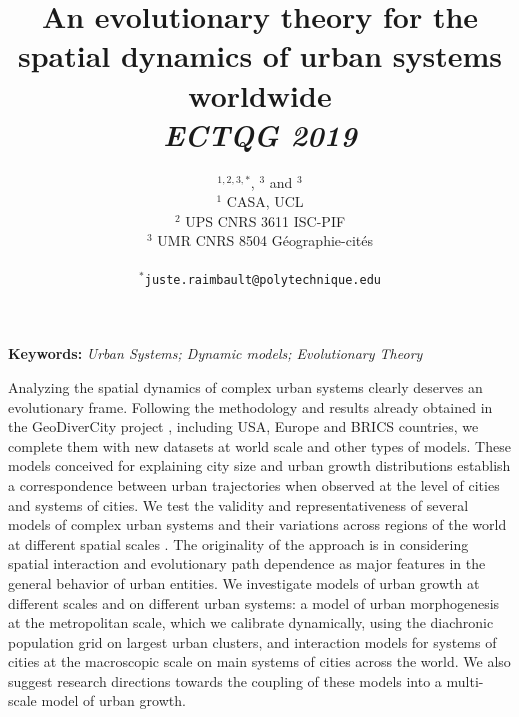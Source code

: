 \documentclass[11pt]{article}
\begin{document}
\title{\vspace{-1.5cm}An evolutionary theory for the spatial dynamics of urban systems worldwide
\\\medskip
\textit{ECTQG 2019}
}
\author{$^{1,2,3,\ast}$, $^3$ and $^3$\medskip\\
$^1$ CASA, UCL\\
$^2$ UPS CNRS 3611 ISC-PIF\\
$^3$ UMR CNRS 8504 G{\'e}ographie-cit{\'e}s\\
\medskip\\
$^{\ast}$\texttt{juste.raimbault@polytechnique.edu}
}
\date{}

\maketitle

\justify



\textbf{Keywords: }\textit{Urban Systems; Dynamic models; Evolutionary Theory}




\medskip


Analyzing the spatial dynamics of complex urban systems clearly deserves an evolutionary frame. Following the methodology and results already obtained in the GeoDiverCity project \citep{pumain2015multilevel,cura2017old,pumain2017urban}, including USA, Europe and BRICS countries, we complete them with new datasets at world scale and other types of models. These models conceived for explaining city size and urban growth distributions establish a correspondence between urban trajectories when observed at the level of cities and systems of cities. We test the validity and representativeness of several models of complex urban systems and their variations across regions of the world at different spatial scales \citep{raimbault2018calibration,raimbault2018indirect}. The originality of the approach is in considering spatial interaction and evolutionary path dependence as major features in the general behavior of urban entities. We investigate models of urban growth at different scales and on different urban systems: a model of urban morphogenesis at the metropolitan scale, which we calibrate dynamically, using the diachronic population grid on largest urban clusters, and interaction models for systems of cities at the macroscopic scale on main systems of cities across the world. We also suggest research directions towards the coupling of these models into a multi-scale model of urban growth.
\end{document}
